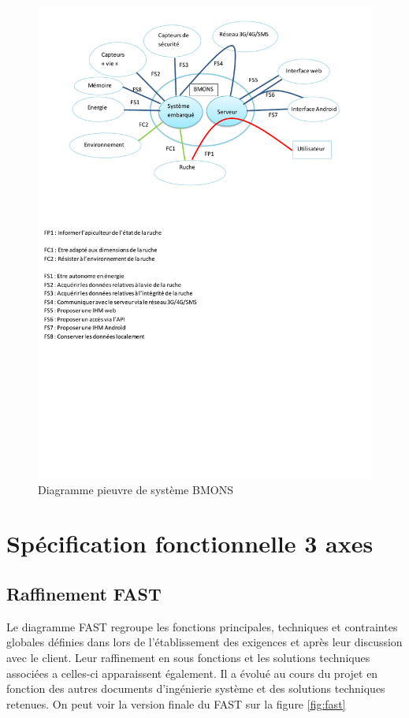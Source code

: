 \begin{figure}[h]
\centering\includegraphics[scale=0.7]{diagpieuvre.pdf}
\caption{\label{fig:diagpieuvre} Diagramme pieuvre de système BMONS}
\end{figure}


\chapter{Spécification fonctionnelle  3 axes}

\section{Raffinement FAST}
Le diagramme FAST regroupe les fonctions principales, techniques et contraintes globales définies dans lors de 
l'établissement des exigences et après leur discussion avec le client. Leur raffinement en sous fonctions et les solutions techniques 
associées a celles-ci apparaissent également. Il a évolué au cours du projet en fonction des autres documents 
d'ingénierie système et des solutions techniques retenues. On peut voir la version finale du FAST sur la figure \ref{fig:fast}


